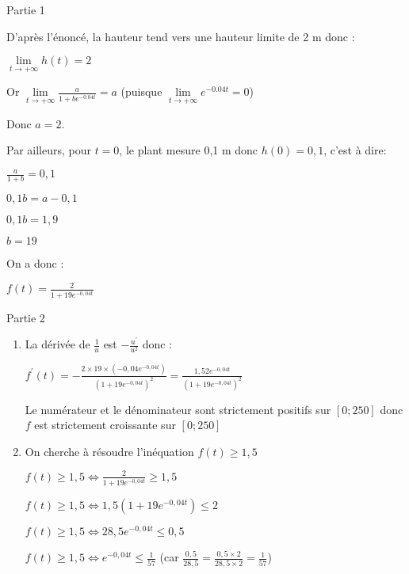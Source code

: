 \begin{corrige}
     \begin{h3}Partie 1\end{h3}
     D'après l'énoncé, la hauteur tend vers une hauteur limite de 2 m donc :
     \par
     $\lim\limits_{t\rightarrow +\infty }h\left(t\right)=2$
     \par
     Or $\lim\limits_{t\rightarrow +\infty }\frac{a}{1+be^{-0.04t}}=a$ (puisque $\lim\limits_{t\rightarrow +\infty }e^{-0.04t}=0$)
     \par
     Donc $a=2$.
     \par
     Par ailleurs, pour $t=0$, le plant mesure 0,1 m donc $h\left(0\right)=0,1$, c'est à dire:
     \par
     $\frac{a}{1+b}=0,1$
     \par
     $0,1b=a-0,1$
     \par
     $0,1b=1,9$
     \par
     $b=19$
     \par
     On a donc :
     \par
     $f\left(t\right)=\frac{2}{1+19e^{-0,04t}}$
     \begin{h3}Partie 2\end{h3}
     \begin{enumerate}
          \item
          La dérivée de $\frac{1}{u}$ est $-\frac{u^{\prime}}{u^{2}}$ donc :
          \par
          $f^{\prime}\left(t\right)=-\frac{2\times 19\times \left(-0,04e^{-0,04t}\right)}{\left(1+19e^{-0,04t}\right)^{2}}=\frac{1,52e^{-0,04t}}{\left(1+19e^{-0,04t}\right)^{2}}$
          \par
          Le numérateur et le dénominateur sont strictement positifs sur $\left[0 ; 250\right]$ donc $f$ est strictement croissante sur $\left[0 ; 250\right]$
          \item
          On cherche à résoudre l'inéquation $f\left(t\right)\geqslant 1,5$
          \par
          $f\left(t\right)\geqslant 1,5 \Leftrightarrow  \frac{2}{1+19e^{-0,04t}} \geqslant  1,5$
          \par
          $f\left(t\right)\geqslant 1,5 \Leftrightarrow  1,5\left(1+19e^{-0,04t}\right) \leqslant  2$
          \par
          $f\left(t\right)\geqslant 1,5 \Leftrightarrow  28,5e^{-0,04t} \leqslant  0,5$
          \par
          $f\left(t\right)\geqslant 1,5 \Leftrightarrow e^{-0,04t} \leqslant  \frac{1}{57}$ (car $\frac{0,5}{28,5}=\frac{0,5\times 2}{28,5\times 2}= \frac{1}{57}$)

\end{enumerate}
\end{corrige}
